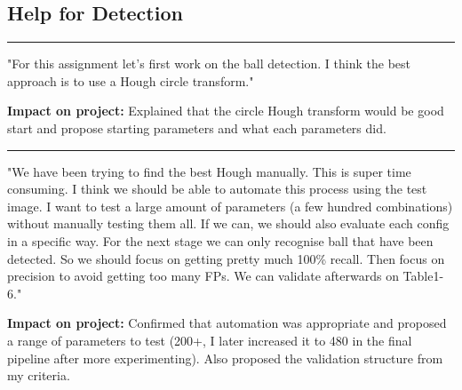 \documentclass[12pt,a4paper]{article}
\newenvironment{promptentry}{%
    \par\Needspace{7\baselineskip}\addvspace{1.2em}
    \hrule
    \nobreak\vspace{0.5em}
}{\par\addvspace{0.5em}}
\newenvironment{aiprompt}{%
    \begin{list}{}{%
        \setlength{\leftmargin}{1em}%
        \setlength{\rightmargin}{1em}%
        \setlength{\topsep}{0.3em}%
        \setlength{\parsep}{0pt}%
    }%
    \item\relax
}{\end{list}}
\begin{document}
\subsection{Help for Detection}

\begin{promptentry}

\begin{aiprompt}
"For this assignment let's first work on the ball detection. I think
the best approach is to use a Hough circle transform."
\end{aiprompt}

\textbf{Impact on project:} Explained that the circle Hough transform would be 
good start and propose starting parameters and what each parameters did.

\end{promptentry}
\FloatBarrier

\begin{promptentry}

\begin{aiprompt}
"We have been trying to find the best Hough manually. This is super time consuming.
I think we should be able to automate this process using the test image.
I want to test a large amount of parameters (a few hundred combinations) without manually testing them all.
If we can, we should also evaluate each config in a specific way.
For the next stage we can only recognise ball that have been detected.
So we should focus on getting pretty much 100\% recall. Then focus on precision
to avoid getting too many FPs. We can validate afterwards on Table1-6."
\end{aiprompt}

\textbf{Impact on project:} Confirmed that automation was appropriate and 
proposed a range of parameters to test (200+, I later increased it to 480 in the final
pipeline after more experimenting). Also proposed the validation structure from my criteria.

\end{promptentry}
\FloatBarrier
\end{document}
